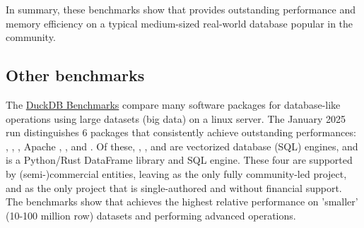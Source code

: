 \documentclass[article]{jss} %
\begin{document}
In summary, these benchmarks show that  provides outstanding performance and memory efficiency on a typical medium-sized real-world database popular in the  community.
%
%
%
%
\subsection{Other benchmarks}
%
The \href{https://duckdblabs.github.io/db-benchmark/}{DuckDB Benchmarks} compare many software packages for database-like operations using large datasets (big data) on a linux server. The January 2025 run distinguishes 6 packages that consistently achieve outstanding performances: , , , Apache , , and . Of these, , , and  are vectorized database (SQL) engines, and  is a Python/Rust DataFrame library and SQL engine. These four are supported by (semi-)commercial entities, leaving  as the only fully community-led project, and  as the only project that is single-authored and without financial support. The benchmarks show that  achieves the highest relative performance on 'smaller' (10-100 million row) datasets and performing advanced operations. \newline
\end{document}
